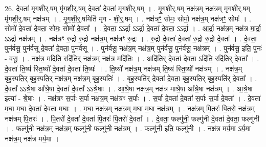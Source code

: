 \documentclass[17pt]{extarticle}
\begin{document}
26. दे॒वता॑ मृगशी॒र्॒.षम् मृ॑गशी॒र्॒.षम् दे॒वता॑ दे॒वता॑ मृगशी॒र्॒.षम् । . मृ॒ग॒शी॒र्॒.षम् नक्ष॑त्र॒म् नक्ष॑त्रम् मृगशी॒र्॒.षम् मृ॑गशी॒र्॒.षम् नक्ष॑त्रम् । . मृ॒ग॒शी॒र्॒.षमिति॑ मृग - शी॒र्॒.षम् । . नक्ष॑त्रꣳ॒॒ सोमः॒ सोमो॒ नक्ष॑त्र॒म् नक्ष॑त्रꣳ॒॒ सोमः॑ । . सोमो॑ दे॒वता॑ दे॒वता॒ सोमः॒ सोमो॑ दे॒वता᳚ । . दे॒वता॒ ऽऽर्द्रा ऽऽर्द्रा दे॒वता॑ दे॒वता॒ ऽऽर्द्रा । . आ॒र्द्रा नक्ष॑त्र॒म् नक्ष॑त्र मा॒र्द्रा ऽऽर्द्रा नक्ष॑त्रम् । . नक्ष॑त्रꣳ रु॒द्रो रु॒द्रो नक्ष॑त्र॒म् नक्ष॑त्रꣳ रु॒द्रः । . रु॒द्रो दे॒वता॑ दे॒वता॑ रु॒द्रो रु॒द्रो दे॒वता᳚ । . दे॒वता॒ पुन॑र्वसू॒ पुन॑र्वसू दे॒वता॑ दे॒वता॒ पुन॑र्वसू । . पुन॑र्वसू॒ नक्ष॑त्र॒म् नक्ष॑त्र॒म् पुन॑र्वसू॒ पुन॑र्वसू॒ नक्ष॑त्रम् । . पुन॑र्वसू॒ इति॒ पुनः॑ - व॒सू॒ । . नक्ष॑त्र॒ मदि॑ति॒ रदि॑ति॒र् नक्ष॑त्र॒म् नक्ष॑त्र॒ मदि॑तिः । . अदि॑तिर् दे॒वता॑ दे॒वता ऽदि॑ति॒ रदि॑तिर् दे॒वता᳚ । . दे॒वता॑ ति॒ष्य॑ स्ति॒ष्यो॑ दे॒वता॑ दे॒वता॑ ति॒ष्यः॑ । . ति॒ष्यो॑ नक्ष॑त्र॒म् नक्ष॑त्रम् ति॒ष्य॑ स्ति॒ष्यो॑ नक्ष॑त्रम् । . नक्ष॑त्र॒म् बृह॒स्पति॒र् बृह॒स्पति॒र् नक्ष॑त्र॒म् नक्ष॑त्र॒म् बृह॒स्पतिः॑ । . बृह॒स्पति॑र् दे॒वता॑ दे॒वता॒ बृह॒स्पति॒र् बृह॒स्पति॑र् दे॒वता᳚ । . दे॒वता᳚ ऽऽश्रे॒षा आ᳚श्रे॒षा दे॒वता॑ दे॒वता᳚ ऽऽश्रे॒षाः । . आ॒श्रे॒षा नक्ष॑त्र॒म् नक्ष॑त्र माश्रे॒षा आ᳚श्रे॒षा नक्ष॑त्रम् । . आ॒श्रे॒षा इत्या᳚ - श्रे॒षाः । . नक्ष॑त्रꣳ स॒र्पाः स॒र्पा नक्ष॑त्र॒म् नक्ष॑त्रꣳ स॒र्पाः । . स॒र्पा दे॒वता॑ दे॒वता॑ स॒र्पाः स॒र्पा दे॒वता᳚ । . दे॒वता॑ म॒घा म॒घा दे॒वता॑ दे॒वता॑ म॒घाः । . म॒घा नक्ष॑त्र॒म् नक्ष॑त्रम् म॒घा म॒घा नक्ष॑त्रम् । . नक्ष॑त्रम् पि॒तरः॑ पि॒तरो॒ नक्ष॑त्र॒म् नक्ष॑त्रम् पि॒तरः॑ । . पि॒तरो॑ दे॒वता॑ दे॒वता॑ पि॒तरः॑ पि॒तरो॑ दे॒वता᳚ । . दे॒वता॒ फल्गु॑नी॒ फल्गु॑नी दे॒वता॑ दे॒वता॒ फल्गु॑नी । . फल्गु॑नी॒ नक्ष॑त्र॒म् नक्ष॑त्र॒म् फल्गु॑नी॒ फल्गु॑नी॒ नक्ष॑त्रम् । . फल्गु॑नी॒ इति॒ फल्गु॑नी । . नक्ष॑त्र मर्य॒मा ऽर्य॒मा नक्ष॑त्र॒म् नक्ष॑त्र मर्य॒मा । \newline
\end{document}
